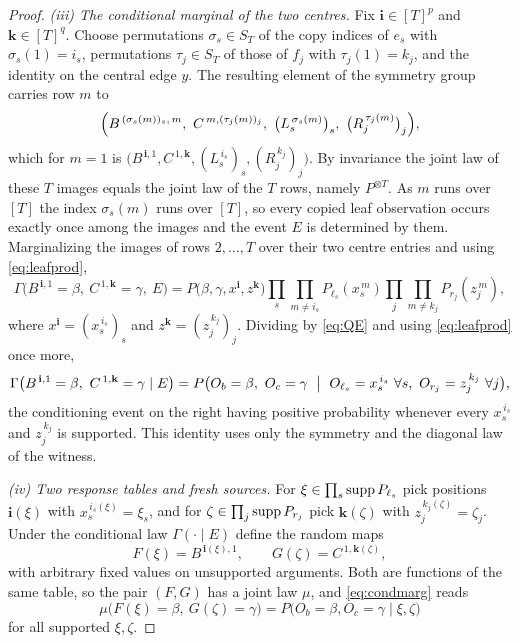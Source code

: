 \begin{proof}
\medskip
\emph{(iii) The conditional marginal of the two centres.}
Fix $\mathbf i\in[T]^p$ and $\mathbf k\in[T]^q$. Choose permutations $\sigma_s\in S_T$ of the copy indices of $e_s$ with $\sigma_s(1)=i_s$, permutations $\tau_j\in S_T$ of those of $f_j$ with $\tau_j(1)=k_j$, and the identity on the central edge $y$. The resulting element of the symmetry group carries row $m$ to
\[
\Bigl(B^{\,(\sigma_s(m))_s,\,m},\ C^{\,m,(\tau_j(m))_j},\ \bigl(L_s^{\,\sigma_s(m)}\bigr)_s,\ \bigl(R_j^{\,\tau_j(m)}\bigr)_j\Bigr),
\]
which for $m=1$ is $\bigl(B^{\,\mathbf i,1},C^{\,1,\mathbf k},(L_s^{\,i_s})_s,(R_j^{\,k_j})_j\bigr)$. By invariance the joint law of these $T$ images equals the joint law of the $T$ rows, namely $P^{\otimes T}$. As $m$ runs over $[T]$ the index $\sigma_s(m)$ runs over $[T]$, so every copied leaf observation occurs exactly once among the images and the event $E$ is determined by them. Marginalizing the images of rows $2,\dots,T$ over their two centre entries and using \eqref{eq:leafprod},
\[
\Gamma\bigl(B^{\,\mathbf i,1}=\beta,\ C^{\,1,\mathbf k}=\gamma,\ E\bigr)
=P\bigl(\beta,\gamma,x^{\mathbf i},z^{\mathbf k}\bigr)
\prod_s\prod_{m\ne i_s}P_{\ell_s}(x_s^{\,m})\prod_j\prod_{m\ne k_j}P_{r_j}(z_j^{\,m}),
\]
where $x^{\mathbf i}=(x_s^{\,i_s})_s$ and $z^{\mathbf k}=(z_j^{\,k_j})_j$. Dividing by \eqref{eq:QE} and using \eqref{eq:leafprod} once more,
\begin{equation}\label{eq:condmarg}
\Gamma\bigl(B^{\,\mathbf i,1}=\beta,\ C^{\,1,\mathbf k}=\gamma\mid E\bigr)
=P\bigl(O_b=\beta,\ O_c=\gamma\ \bigm|\ O_{\ell_s}=x_s^{\,i_s}\ \forall s,\ O_{r_j}=z_j^{\,k_j}\ \forall j\bigr),
\end{equation}
the conditioning event on the right having positive probability whenever every $x_s^{\,i_s}$ and $z_j^{\,k_j}$ is supported. This identity uses only the symmetry and the diagonal law of the witness.

\medskip
\emph{(iv) Two response tables and fresh sources.}
For $\xi\in\prod_s\operatorname{supp} P_{\ell_s}$ pick positions $\mathbf i(\xi)$ with $x_s^{\,i_s(\xi)}=\xi_s$, and for $\zeta\in\prod_j\operatorname{supp} P_{r_j}$ pick $\mathbf k(\zeta)$ with $z_j^{\,k_j(\zeta)}=\zeta_j$. Under the conditional law $\Gamma(\cdot\mid E)$ define the random maps
\[
F(\xi)=B^{\,\mathbf i(\xi),1},\qquad G(\zeta)=C^{\,1,\mathbf k(\zeta)},
\]
with arbitrary fixed values on unsupported arguments. Both are functions of the same table, so the pair $(F,G)$ has a joint law $\mu$, and \eqref{eq:condmarg} reads
\begin{equation}\label{eq:mutable}
\mu\bigl(F(\xi)=\beta,\ G(\zeta)=\gamma\bigr)=P\bigl(O_b=\beta,O_c=\gamma\mid\xi,\zeta\bigr)
\end{equation}
for all supported $\xi,\zeta$.


\end{proof}
